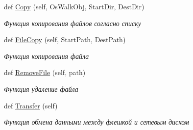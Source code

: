 \begin{DoxyCompactItemize}
def \mbox{\hyperlink{classisofc-service_1_1SambaConnect_a21b2d32bfb95e56cf146499a1f1b48f0}{Copy}} (self, Os\+Walk\+Obj, Start\+Dir, Dest\+Dir)
\begin{DoxyCompactList}\small\item\em Функция копирования файлов согласно списку \end{DoxyCompactList}\item 
def \mbox{\hyperlink{classisofc-service_1_1SambaConnect_a8dba7ba6f3526fcab4703dba0f5bdcd5}{File\+Copy}} (self, Start\+Path, Dest\+Path)
\begin{DoxyCompactList}\small\item\em Функция копирования файла \end{DoxyCompactList}\item 
def \mbox{\hyperlink{classisofc-service_1_1SambaConnect_a8e1ce795e1e813c874d32d9abce8179e}{Remove\+File}} (self, path)
\begin{DoxyCompactList}\small\item\em Функция удаление файла \end{DoxyCompactList}\item 
def \mbox{\hyperlink{classisofc-service_1_1SambaConnect_aeaa767a173ce5e1f7d92770d53b7878d}{Transfer}} (self)
\begin{DoxyCompactList}\small\item\em Функция обмена данными между флешкой и сетевым диском \end{DoxyCompactList}\end{DoxyCompactItemize}
